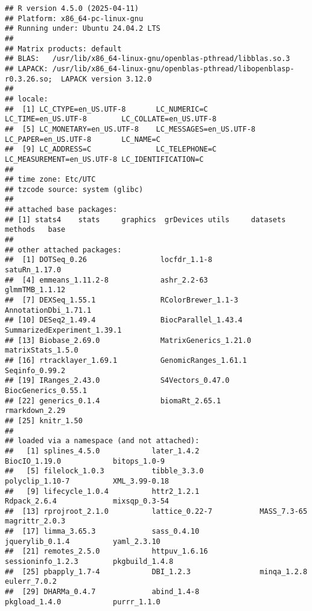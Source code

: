 \documentclass[
]{article}
\begin{document}
\begin{verbatim}
## R version 4.5.0 (2025-04-11)
## Platform: x86_64-pc-linux-gnu
## Running under: Ubuntu 24.04.2 LTS
## 
## Matrix products: default
## BLAS:   /usr/lib/x86_64-linux-gnu/openblas-pthread/libblas.so.3 
## LAPACK: /usr/lib/x86_64-linux-gnu/openblas-pthread/libopenblasp-r0.3.26.so;  LAPACK version 3.12.0
## 
## locale:
##  [1] LC_CTYPE=en_US.UTF-8       LC_NUMERIC=C               LC_TIME=en_US.UTF-8        LC_COLLATE=en_US.UTF-8    
##  [5] LC_MONETARY=en_US.UTF-8    LC_MESSAGES=en_US.UTF-8    LC_PAPER=en_US.UTF-8       LC_NAME=C                 
##  [9] LC_ADDRESS=C               LC_TELEPHONE=C             LC_MEASUREMENT=en_US.UTF-8 LC_IDENTIFICATION=C       
## 
## time zone: Etc/UTC
## tzcode source: system (glibc)
## 
## attached base packages:
## [1] stats4    stats     graphics  grDevices utils     datasets  methods   base     
## 
## other attached packages:
##  [1] DOTSeq_0.26                 locfdr_1.1-8                satuRn_1.17.0              
##  [4] emmeans_1.11.2-8            ashr_2.2-63                 glmmTMB_1.1.12             
##  [7] DEXSeq_1.55.1               RColorBrewer_1.1-3          AnnotationDbi_1.71.1       
## [10] DESeq2_1.49.4               BiocParallel_1.43.4         SummarizedExperiment_1.39.1
## [13] Biobase_2.69.0              MatrixGenerics_1.21.0       matrixStats_1.5.0          
## [16] rtracklayer_1.69.1          GenomicRanges_1.61.1        Seqinfo_0.99.2             
## [19] IRanges_2.43.0              S4Vectors_0.47.0            BiocGenerics_0.55.1        
## [22] generics_0.1.4              biomaRt_2.65.1              rmarkdown_2.29             
## [25] knitr_1.50                 
## 
## loaded via a namespace (and not attached):
##   [1] splines_4.5.0            later_1.4.2              BiocIO_1.19.0            bitops_1.0-9            
##   [5] filelock_1.0.3           tibble_3.3.0             polyclip_1.10-7          XML_3.99-0.18           
##   [9] lifecycle_1.0.4          httr2_1.2.1              Rdpack_2.6.4             mixsqp_0.3-54           
##  [13] rprojroot_2.1.0          lattice_0.22-7           MASS_7.3-65              magrittr_2.0.3          
##  [17] limma_3.65.3             sass_0.4.10              jquerylib_0.1.4          yaml_2.3.10             
##  [21] remotes_2.5.0            httpuv_1.6.16            sessioninfo_1.2.3        pkgbuild_1.4.8          
##  [25] pbapply_1.7-4            DBI_1.2.3                minqa_1.2.8              eulerr_7.0.2            
##  [29] DHARMa_0.4.7             abind_1.4-8              pkgload_1.4.0            purrr_1.1.0             

\end{verbatim}
\end{document}

